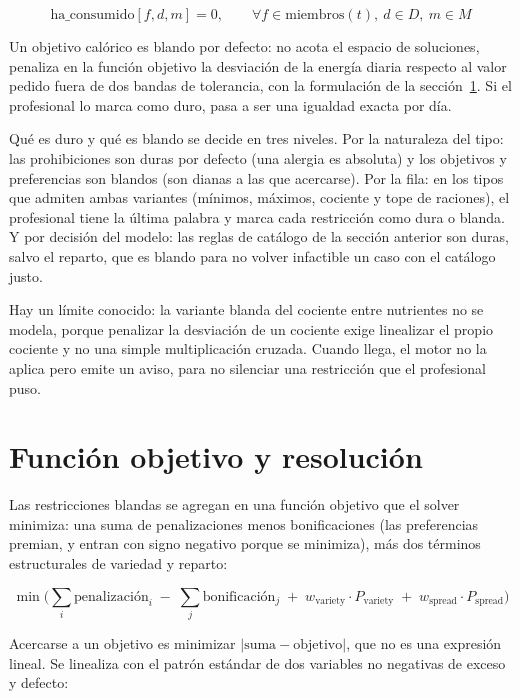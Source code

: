 \begin{equation*}
\text{ha\_consumido}[f,d,m] = 0, \qquad \forall f \in \text{miembros}(t),\ d \in D,\ m \in M
\end{equation*}

Un objetivo calórico es blando por defecto: no acota el espacio de soluciones, penaliza en la función objetivo la desviación de la energía diaria respecto al valor pedido fuera de dos bandas de tolerancia, con la formulación de la sección~\ref{sec:objetivoResolucion}. Si el profesional lo marca como duro, pasa a ser una igualdad exacta por día.

Qué es duro y qué es blando se decide en tres niveles. Por la naturaleza del tipo: las prohibiciones son duras por defecto (una alergia es absoluta) y los objetivos y preferencias son blandos (son dianas a las que acercarse). Por la fila: en los tipos que admiten ambas variantes (mínimos, máximos, cociente y tope de raciones), el profesional tiene la última palabra y marca cada restricción como dura o blanda. Y por decisión del modelo: las reglas de catálogo de la sección anterior son duras, salvo el reparto, que es blando para no volver infactible un caso con el catálogo justo.

Hay un límite conocido: la variante blanda del cociente entre nutrientes no se modela, porque penalizar la desviación de un cociente exige linealizar el propio cociente y no una simple multiplicación cruzada. Cuando llega, el motor no la aplica pero emite un aviso, para no silenciar una restricción que el profesional puso.

\section{Función objetivo y resolución}
\label{sec:objetivoResolucion}

Las restricciones blandas se agregan en una función objetivo que el solver minimiza: una suma de penalizaciones menos bonificaciones (las preferencias premian, y entran con signo negativo porque se minimiza), más dos términos estructurales de variedad y reparto:

\begin{equation*}
\min \Big( \sum_{i} \text{penalización}_i \;-\; \sum_{j} \text{bonificación}_j \;+\; w_{\text{variety}} \cdot P_{\text{variety}} \;+\; w_{\text{spread}} \cdot P_{\text{spread}} \Big)
\end{equation*}

Acercarse a un objetivo es minimizar $|\text{suma} - \text{objetivo}|$, que no es una expresión lineal. Se linealiza con el patrón estándar de dos variables no negativas de exceso y defecto:

